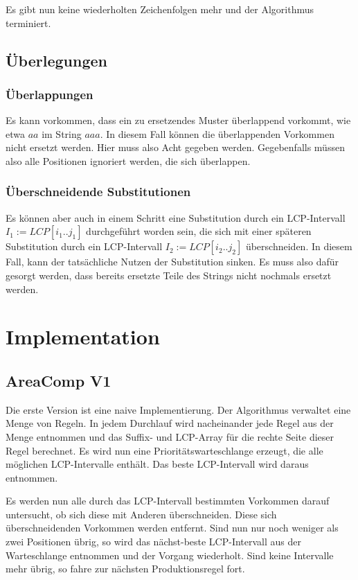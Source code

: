 Es gibt nun keine wiederholten Zeichenfolgen mehr und der Algorithmus terminiert.

\subsection{Überlegungen}

\subsubsection{Überlappungen}

Es kann vorkommen, dass ein zu ersetzendes Muster überlappend vorkommt, wie etwa $aa$ im String $aaa$. In diesem Fall können die überlappenden Vorkommen nicht ersetzt werden. Hier muss also Acht gegeben werden. Gegebenfalls müssen also alle Positionen ignoriert werden, die sich überlappen.

\subsubsection{Überschneidende Substitutionen}

Es können aber auch in einem Schritt eine Substitution durch ein LCP-Intervall $I_1 := LCP[i_1..j_1]$ durchgeführt worden sein, die sich mit einer späteren Substitution durch ein LCP-Intervall $I_2 := LCP[i_2..j_2]$ überschneiden. In diesem Fall, kann der tatsächliche Nutzen der Substitution sinken. Es muss also dafür gesorgt werden, dass bereits ersetzte Teile des Strings nicht nochmals ersetzt werden.

\section{Implementation}

\subsection{AreaComp V1}

Die erste Version ist eine naive Implementierung. Der Algorithmus verwaltet eine Menge von Regeln. In jedem Durchlauf wird nacheinander jede Regel aus der Menge entnommen und das Suffix- und LCP-Array für die rechte Seite dieser Regel berechnet. Es wird nun eine Prioritätswarteschlange erzeugt, die alle möglichen LCP-Intervalle enthält. Das beste LCP-Intervall wird daraus entnommen. 

Es werden nun alle durch das LCP-Intervall bestimmten Vorkommen darauf untersucht, ob sich diese mit Anderen überschneiden. Diese sich überschneidenden Vorkommen werden entfernt. Sind nun nur noch weniger als zwei Positionen übrig, so wird das nächst-beste LCP-Intervall aus der Warteschlange entnommen und der Vorgang wiederholt. Sind keine Intervalle mehr übrig, so fahre zur nächsten Produktionsregel fort.

